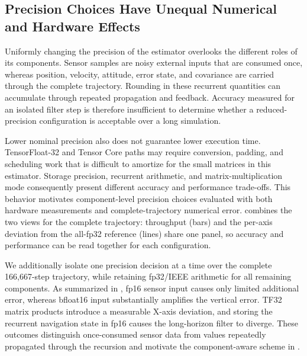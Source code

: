 \subsection{Precision Choices Have Unequal Numerical and Hardware Effects}
\label{subsec:motivation-precision}

Uniformly changing the precision of the estimator overlooks the different roles of its components. Sensor samples are noisy external inputs that are consumed once, whereas position, velocity, attitude, error state, and covariance are carried through the complete trajectory. Rounding in these recurrent quantities can accumulate through repeated propagation and feedback. Accuracy measured for an isolated filter step is therefore insufficient to determine whether a reduced-precision configuration is acceptable over a long simulation.

Lower nominal precision also does not guarantee lower execution time. TensorFloat-32 and Tensor Core paths may require conversion, padding, and scheduling work that is difficult to amortize for the small matrices in this estimator. Storage precision, recurrent arithmetic, and matrix-multiplication mode consequently present different accuracy and performance trade-offs. This behavior motivates component-level precision choices evaluated with both hardware measurements and complete-trajectory numerical error.  combines the two views for the complete trajectory: throughput (bars) and the per-axis deviation from the all-fp32 reference (lines) share one panel, so accuracy and performance can be read together for each configuration.

We additionally isolate one precision decision at a time over the complete 166,667-step trajectory, while retaining fp32/IEEE arithmetic for all remaining components. As summarized in , fp16 sensor input causes only limited additional error, whereas bfloat16 input substantially amplifies the vertical error. TF32 matrix products introduce a measurable X-axis deviation, and storing the recurrent navigation state in fp16 causes the long-horizon filter to diverge. These outcomes distinguish once-consumed sensor data from values repeatedly propagated through the recursion and motivate the component-aware scheme in .

